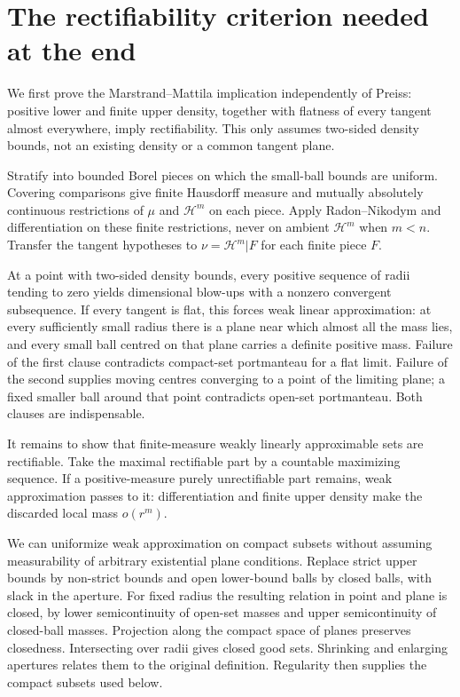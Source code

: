 \section{The rectifiability criterion needed at the end}
We first prove the Marstrand--Mattila implication independently of Preiss:
positive lower and finite upper density, together with flatness of every
tangent almost everywhere, imply rectifiability. This only assumes two-sided
density bounds, not an existing density or a common tangent plane.

Stratify into bounded Borel pieces on which the small-ball bounds are uniform.
Covering comparisons give finite Hausdorff measure and mutually absolutely
continuous restrictions of $\mu$ and $\mathcal H^m$ on each piece. Apply
Radon--Nikodym and differentiation on these finite restrictions, never on
ambient $\mathcal H^m$ when $m<n$. Transfer the tangent hypotheses to
$\nu=\mathcal H^m|F$ for each finite piece $F$.

At a point with two-sided density bounds, every positive sequence of radii
tending to zero yields dimensional blow-ups with a nonzero convergent subsequence. If every tangent is flat,
this forces weak linear approximation: at every sufficiently small radius
there is a plane near which almost all the mass lies, and every small ball
centred on that plane carries a definite positive mass. Failure of the first
clause contradicts compact-set portmanteau for a flat limit. Failure of the
second supplies moving centres converging to a point of the limiting plane;
a fixed smaller ball around that point contradicts open-set portmanteau.
Both clauses are indispensable.

It remains to show that finite-measure weakly linearly approximable sets are
rectifiable. Take the maximal rectifiable part by a countable maximizing
sequence. If a positive-measure purely unrectifiable part remains, weak
approximation passes to it: differentiation and finite upper density make the
discarded local mass $o(r^m)$.

We can uniformize weak approximation on compact subsets without assuming
measurability of arbitrary existential plane conditions. Replace strict upper
bounds by non-strict bounds and open lower-bound balls by closed balls, with
slack in the aperture. For fixed radius the resulting relation in point and
plane is closed, by lower semicontinuity of open-set masses and upper
semicontinuity of closed-ball masses. Projection along the compact space of
planes preserves closedness. Intersecting over radii gives closed good sets.
Shrinking and enlarging apertures relates them to the original definition.
Regularity then supplies the compact subsets used below.

